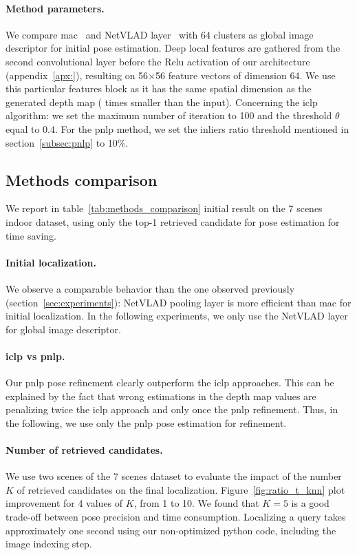 \paragraph{Method parameters.} We compare \ac{mac}~\citep{Razavian2014a} and NetVLAD layer~\citep{Arandjelovic2017} with 64 clusters as global image descriptor for initial pose estimation. Deep local features are gathered from the second convolutional layer before the Relu activation of our architecture (appendix~\ref{apx:}), resulting on 56$\times$56 feature vectors of dimension 64. We use this particular features block as it has the same spatial dimension as the generated depth map ( times smaller than the input). Concerning the \ac{iclp} algorithm: we set the maximum number of iteration to 100 and the threshold $\theta$ equal to $0.4$. For the \ac{pnlp} method, we set the inliers ratio threshold mentioned in section~\ref{subsec:pnlp} to 10\%.


\subsection{Methods comparison}
We report in table~\ref{tab:methods_comparison} initial result on the 7 scenes indoor dataset, using only the top-1 retrieved candidate for pose estimation for time saving. 

\paragraph{Initial localization.} We observe a comparable behavior than the one observed previously (section~\ref{sec:experiments}): NetVLAD pooling layer is more efficient than \ac{mac} for initial localization. In the following experiments, we only use the NetVLAD layer for global image descriptor. 

\paragraph{\ac{iclp} vs \ac{pnlp}.} Our \ac{pnlp} pose refinement clearly outperform the \ac{iclp} approaches. This can be explained by the fact that wrong estimations in the depth map values are penalizing twice the \ac{iclp} approach and only once the \ac{pnlp} refinement. Thus, in the following, we use only the \ac{pnlp} pose estimation for refinement.


\paragraph{Number of retrieved candidates.} We use two scenes of the 7 scenes dataset to evaluate the impact of the number $K$ of retrieved candidates on the final localization. Figure~\ref{fig:ratio_t_knn} plot improvement for 4 values of $K$, from 1 to 10. We found that $K=5$ is a good trade-off between pose precision and time consumption. Localizing a query takes approximately one second using our non-optimized python code, including the image indexing step.